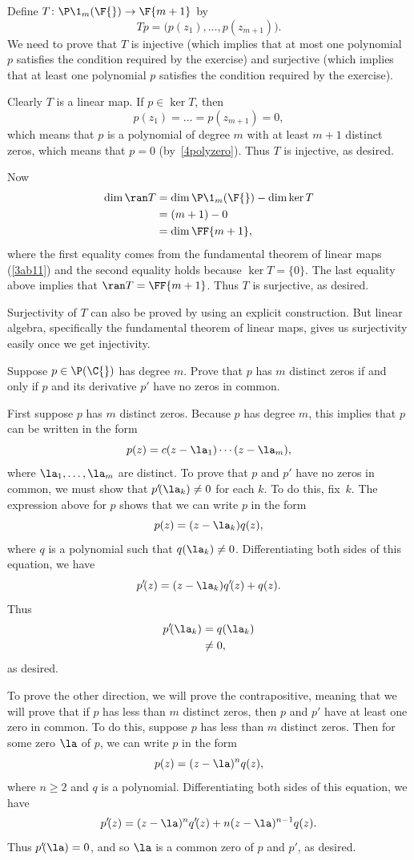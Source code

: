 \begin{Solution}
Define $T \colon \P\1_m(\F{}) \to \F{m+1}$ by
\[
Tp = \bigl(p(z_1), \dots, p(z_{m+1})\bigr).
\]
We need to prove that $T$ is injective (which implies that at most one
polynomial $p$ satisfies the condition required by the exercise) and surjective
(which implies that at least one polynomial $p$ satisfies the condition required
by the exercise).

Clearly $T$ is a linear map.  If $p \in \ker T$, then
\[
p(z_1) = \dots = p(z_{m+1}) = 0,
\]
which means that $p$ is a polynomial of degree $m$ with at least $m+1$ distinct
zeros, which means that $p = 0$ (by~\ref{4polyzero}).  Thus $T$ is injective, as
desired.

Now
\begin{align*}
\dim \ran T &= \dim \P\1_m(\F{}) - \dim \ker T \\
&= (m + 1) - 0 \\
&= \dim \FF{m+1},
\end{align*}
where the first equality comes from the fundamental theorem of linear maps (\ref{3ab11}) and the second equality holds
because $\ker T = \{0\}$.  The last equality above implies that
$\ran T = \FF{m + 1}$.  Thus $T$ is surjective, as desired.

\Comment
Surjectivity of $T$ can also be proved by using an explicit construction.  But
linear algebra, specifically the fundamental theorem of linear maps, gives us surjectivity easily once we get
injectivity.
\end{Solution}

\exercise
Suppose $p \in \P(\C{})$ has degree $m$.  Prove that $p$ has $m$ distinct zeros if
and only if $p$ and its derivative $p'$ have no zeros in common.

\begin{Solution}
First suppose $p$ has $m$ distinct zeros.  Because $p$ has degree $m$, this
implies that $p$ can be written in the form
\[
p(z) = c (z - \la_1) \dotsm (z - \la_m),
\]
where $\la_1, \dots, \la_m$ are distinct.  To prove that $p$ and $p'$ have no
zeros in common, we must show that $p' \! (\la_k) \ne 0$ for each $k$.  To do this,
fix~$k$.  The expression above for $p$ shows that we can write $p$ in the form
\[
p(z) = (z - \la_k) q(z),
\]
where $q$ is a polynomial such that $q(\la_k) \ne 0$.  Differentiating both sides
of this equation, we have
\[
p' \! (z) = (z - \la_k) q' \! (z) + q(z).
\]
Thus
\begin{align*}
p' \! (\la_k) &= q(\la_k) \\
&\ne 0,
\end{align*}
as desired.

To prove the other direction, we will prove the contrapositive, meaning that we
will prove that if $p$ has less than $m$ distinct zeros, then $p$ and $p'$ have at
least one zero in common.  To do this, suppose $p$ has less than $m$ distinct
zeros.  Then for some zero $\la$ of $p$, we can write $p$ in the form
\[
p(z) = (z - \la)^n q(z),
\]
where $n \ge 2$ and $q$ is a polynomial.  Differentiating both sides
of this equation, we have
\[
p' \! (z) = (z - \la)^n q' \! (z) + n (z - \la)^{n-1} q(z).
\]
Thus $p' \! (\la) = 0$, and so $\la$ is a common zero of $p$ and $p'\!$, as desired.
\end{Solution}

